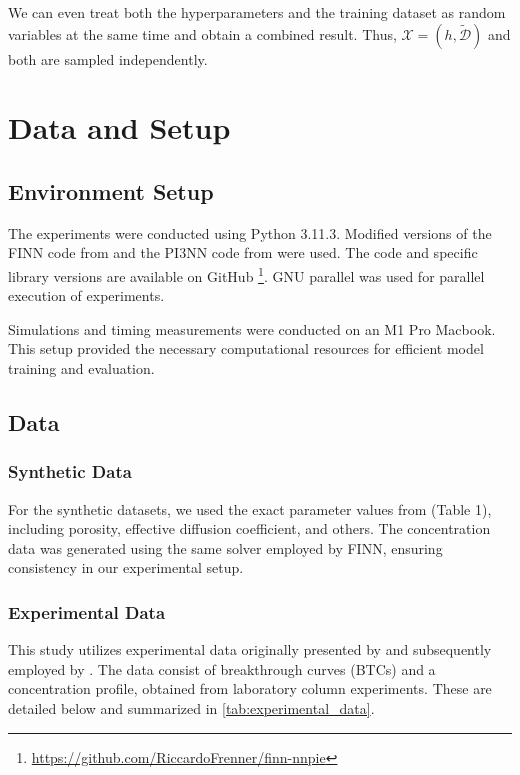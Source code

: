 We can even treat both the hyperparameters and the training dataset as random variables at the same time and obtain a combined result. Thus, $\mathcal{X} = (h, \tilde{\mathcal{D}})$ and both are sampled independently.



\chapter{Data and Setup}
\label{sec:data_and_setup}
\section{Environment Setup}
The experiments were conducted using Python 3.11.3. Modified versions of the FINN code from \textcite{finn} and the PI3NN code from \textcite{pi3nn} were used. The code and specific library versions are available on GitHub \footnote{\url{https://github.com/RiccardoFrenner/finn-nnpie}}. GNU parallel \cite{tange_2023_10199085} was used for parallel execution of experiments.

Simulations and timing measurements were conducted on an M1 Pro Macbook. This setup provided the necessary computational resources for efficient model training and evaluation.


\section{Data}
\subsection{Synthetic Data}
\label{sec:synthetic_data}
For the synthetic datasets, we used the exact parameter values from \textcite{finn} (Table 1), including porosity, effective diffusion coefficient, and others. The concentration data was generated using the same solver employed by FINN, ensuring consistency in our experimental setup.


\subsection{Experimental Data}
\label{sec:experimental_data}

This study utilizes experimental data originally presented by \textcite{nowak2016entropy} and subsequently employed by \textcite{finn}. The data consist of breakthrough curves (BTCs) and a concentration profile, obtained from laboratory column experiments. These are detailed below and summarized in \cref{tab:experimental_data}.

